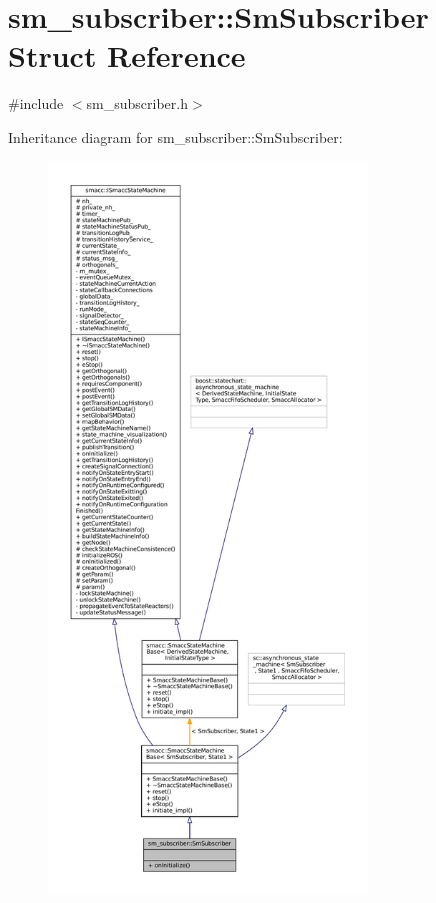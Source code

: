 \hypertarget{structsm__subscriber_1_1SmSubscriber}{}\section{sm\+\_\+subscriber\+:\+:Sm\+Subscriber Struct Reference}
\label{structsm__subscriber_1_1SmSubscriber}


{\ttfamily \#include $<$sm\+\_\+subscriber.\+h$>$}



Inheritance diagram for sm\+\_\+subscriber\+:\+:Sm\+Subscriber\+:
\nopagebreak
\begin{figure}[H]
\begin{center}
\leavevmode
\includegraphics[height=550pt]{structsm__subscriber_1_1SmSubscriber__inherit__graph}
\end{center}
\end{figure}



